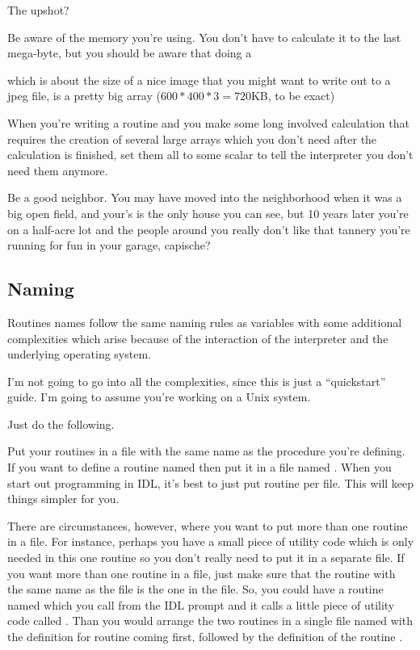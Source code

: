      The upshot? 

     \be
	\item Be aware of the memory you're using. You don't have to
        calculate it to the last mega-byte, but you should be aware that
        doing a 
  


      which is about the size of a nice image that you might want to
      write out to a jpeg file, is a pretty big array ($600*400*3=720$KB, 
      to be exact)

      \item      When you're writing a routine and you make some long
     involved calculation that requires the creation of several large
     arrays which you don't need after the calculation is finished,
     set them all to some scalar to tell the interpreter you don't
     need them anymore. 


     \ee

     Be a good neighbor. You may have moved into the neighborhood when
     it was a big open field, and your's is the only house you can
     see, but 10 years later you're on a half-acre lot and the people
     around you really don't like that tannery you're running for fun
     in your garage, capische?


\subsection{Naming}\label{sec:qs-Programming-naming}

  Routines names follow the same naming rules as variables with some
  additional complexities which arise because of the interaction of
  the interpreter and the underlying operating system.

  I'm not going to go into all the complexities, since this is just a
  ``quickstart'' guide. I'm going to assume you're working on a Unix
  system.

  Just do the following.

  \be

     \item Put your routines in a file with the same name as the
     procedure you're defining. If you want to define a routine named
      then put it in a file named . When you
     start out programming in IDL, it's best to just put 
     routine per file. This will keep things simpler for you. 

     There are circumstances, however, where you want to put more than
     one routine in a file. For instance, perhaps you have a small
     piece of utility code which is only needed in this one routine so
     you don't really need to put it in a separate file. If you want
     more than one routine in a file, just make sure that the routine
     with the same name as the file is the  one in the
     file. So, you could have a routine named  which you
     call from the IDL prompt and it calls a little piece of utility
     code called . Than you would arrange the two routines
     in a single file named  with the definition for
     routine   coming first, followed by the definition of
     the routine .

